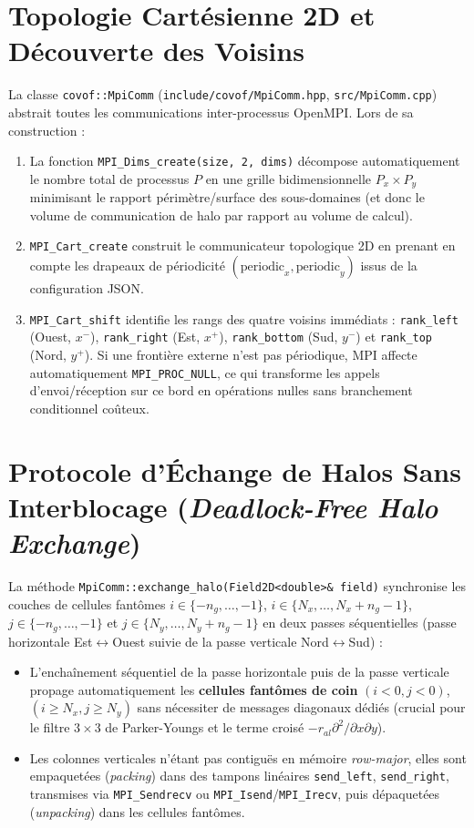 \documentclass[10pt,a4paper,oneside]{book}
\begin{document}
\section{Topologie Cartésienne 2D et Découverte des Voisins}
La classe \texttt{covof::MpiComm} (\texttt{include/covof/MpiComm.hpp}, \texttt{src/MpiComm.cpp}) abstrait toutes les communications inter-processus OpenMPI. Lors de sa construction :
\begin{enumerate}
  \item La fonction \texttt{MPI\_Dims\_create(size, 2, dims)} décompose automatiquement le nombre total de processus $P$ en une grille bidimensionnelle $P_x \times P_y$ minimisant le rapport périmètre/surface des sous-domaines (et donc le volume de communication de halo par rapport au volume de calcul).
  \item \texttt{MPI\_Cart\_create} construit le communicateur topologique 2D en prenant en compte les drapeaux de périodicité $(\text{periodic}_x, \text{periodic}_y)$ issus de la configuration JSON.
  \item \texttt{MPI\_Cart\_shift} identifie les rangs des quatre voisins immédiats : \texttt{rank\_left} (Ouest, $x^-$), \texttt{rank\_right} (Est, $x^+$), \texttt{rank\_bottom} (Sud, $y^-$) et \texttt{rank\_top} (Nord, $y^+$). Si une frontière externe n'est pas périodique, MPI affecte automatiquement \texttt{MPI\_PROC\_NULL}, ce qui transforme les appels d'envoi/réception sur ce bord en opérations nulles sans branchement conditionnel coûteux.
\end{enumerate}

\section{Protocole d'Échange de Halos Sans Interblocage (\emph{Deadlock-Free Halo Exchange})}
La méthode \texttt{MpiComm::exchange\_halo(Field2D<double>\& field)} synchronise les couches de cellules fantômes $i \in \{-n_g, \dots, -1\}$, $i \in \{N_x, \dots, N_x+n_g-1\}$, $j \in \{-n_g, \dots, -1\}$ et $j \in \{N_y, \dots, N_y+n_g-1\}$ en deux passes séquentielles (passe horizontale Est$\leftrightarrow$Ouest suivie de la passe verticale Nord$\leftrightarrow$Sud) :
\begin{itemize}
  \item L'enchaînement séquentiel de la passe horizontale puis de la passe verticale propage automatiquement les \textbf{cellules fantômes de coin} $(i < 0, j < 0)$, $(i \ge N_x, j \ge N_y)$ sans nécessiter de messages diagonaux dédiés (crucial pour le filtre $3\times 3$ de Parker-Youngs et le terme croisé $-r_{al}\partial^2 / \partial x \partial y$).
  \item Les colonnes verticales n'étant pas contiguës en mémoire \emph{row-major}, elles sont empaquetées (\emph{packing}) dans des tampons linéaires \texttt{send\_left}, \texttt{send\_right}, transmises via \texttt{MPI\_Sendrecv} ou \texttt{MPI\_Isend}/\texttt{MPI\_Irecv}, puis dépaquetées (\emph{unpacking}) dans les cellules fantômes.
\end{itemize}
\end{document}

